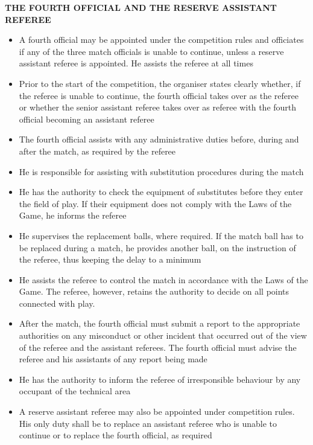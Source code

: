\clearpage
\sffamily
{\bfseries\color[rgb]{0.4,0.4,0.4}THE FOURTH OFFICIAL AND THE RESERVE ASSISTANT REFEREE}

\bigskip

\begin{itemize}
\item A fourth official may be appointed under the competition rules and officiates if any of the three match officials is unable to continue, unless a reserve assistant referee is appointed. He assists the referee
at all times
\item Prior to the start of the competition, the organiser states clearly whether, if the referee is unable to continue, the fourth official takes over as the referee or whether the senior assistant referee takes over as referee with the fourth official becoming an assistant referee
\item The fourth official assists with any administrative duties before, during and after the match, as required by the referee
\item He is responsible for assisting with substitution procedures during the match
\item He has the authority to check the equipment of substitutes before they enter the field of play. If their equipment does not comply with the Laws of the Game, he informs the referee
\item He supervises the replacement balls, where required. If the match ball has to be replaced during a match, he provides another ball, on the instruction of the referee, thus keeping the delay to a minimum
\item He assists the referee to control the match in accordance with the Laws of the Game. The referee, however, retains the authority to decide on
all points connected with play.
\item After the match, the fourth official must submit a report to the appropriate authorities on any misconduct or other incident that occurred out of the view of the referee and the assistant referees. The fourth official must advise the referee and his assistants of any
report being made
\item He has the authority to inform the referee of irresponsible behaviour by any occupant of the technical area
\item A reserve assistant referee may also be appointed under competition rules. His only duty shall be to replace an assistant referee who is unable to continue or to replace the fourth official, as required
\end{itemize}
